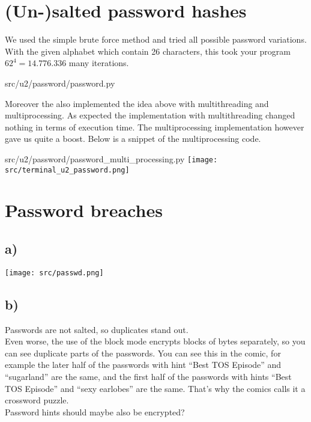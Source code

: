 
\graphicspath{ {./src/} } 
\usepackage{hyperref}

\newcommand{\dozent}{Volker Roth}
\newcommand{\tutor}{Oliver Wiese}
\newcommand{\tutoriumNo}{02\\Materialien: Latex, VSC, Skript}
\newcommand{\ubungNo}{01}
\newcommand{\veranstaltung}{Rechnersicherheit}
\newcommand{\semester}{SoSe 21}






\section{(Un-)salted password hashes}
We used the simple brute force method and tried all possible password variations. With the given alphabet which contain 26 characters, this took your program $62^4 = 14.776.336$ many iterations. 
										
{src/u2/password/password.py}

\newpage
Moreover the also implemented the idea above with multithreading and multiprocessing.
\newline As expected the implementation with multithreading changed nothing in terms of execution time.
\newline The multiprocessing implementation however gave us quite a boost.
\newline Below is a snippet of the multiprocessing code.
	
{src/u2/password/password_multi_processing.py}
\newline \texttt{[image: src/terminal\_u2\_password.png]}

\section{Password breaches}
\subsection*{a)}
\texttt{[image: src/passwd.png]}
\subsection*{b)}
Passwords are not salted, so duplicates stand out. \\
Even worse, the use of the block mode encrypts blocks of bytes separately, so you can see duplicate parts of the passwords. You can see this in the comic, for example the later half of the passwords with hint \enquote{Best TOS Episode} and \enquote{sugarland} are the same, and the first half of the passwords with hints \enquote{Best TOS Episode} and \enquote{sexy earlobes} are the same. That's why the comics calls it a crossword puzzle. \\
Password hints should maybe also be encrypted?

